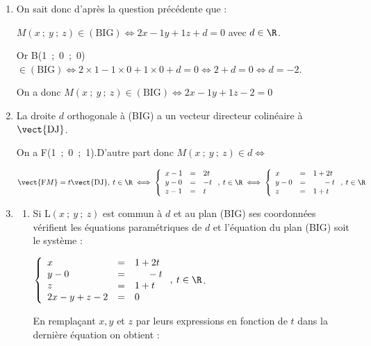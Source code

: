 \begin{enumerate}
$\vect{\text{DJ}}\cdot \vect{\text{BG}} = 0 - 1 + 1 = 0$.

Conclusion $\vect{\text{DJ}}$ est un vecteur normal à deux vecteurs non colin"aires du plan (BIG) : c'est un vecteur normal à ce plan.
\item %
On sait donc d'après la question précédente que :

$M(x~;~y~;~z) \in (\text{BIG}) \iff 2x - 1y + 1z + d = 0$ avec $d \in \R$.

Or B(1~;~0~;~0)$ \in  (\text{BIG}) \iff 2\times 1 - 1 \times 0 + 1 \times 0 + d = 0 \iff 2 + d = 0 \iff d = - 2$.

On a donc $M(x~;~y~;~z) \in (\text{BIG}) \iff 2x - 1y + 1z - 2 = 0$
\item %
La droite $d$ orthogonale à (BIG) a un vecteur directeur colinéaire à $\vect{\text{DJ}}$.

On a F(1~;~0~;~1).D'autre part donc $M(x~;~y~;~z) \in d \iff$

$ \vect{\text{F}M}  = t \vect{\text{DJ}}, \: t \in \R \iff \left\{\begin{array}{l c l}
x - 1&=&2t\\
y - 0&=&- t\\
z- 1&=&t
\end{array}\right., \:t \in \R \iff \left\{\begin{array}{l c l}
x &=&1 + 2t\\
y - 0&=&\phantom{1 + }- t\\
z&=&1 + t
\end{array}\right., \:t \in \R$

\item
	\begin{enumerate}
		\item %
Si L$(x~;~y~;~z)$ est commun à $d$ et au plan (BIG) ses coordonnées vérifient les équations paramétriques de $d$ et l'équation du plan (BIG) soit le système :
		
$\left\{\begin{array}{l c l}
x &=&1 + 2t\\
y - 0&=&\phantom{1 + }- t\\
z&=&1 + t\\
2x - y + z - 2&=&0
\end{array}\right., \:t \in \R$.

En remplaçant $x, y$ et $z$ par leurs expressions en fonction de $t$ dans la dernière équation on obtient :


\end{enumerate}
\end{enumerate}
